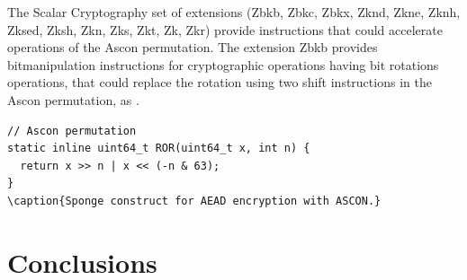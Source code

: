 \documentclass[11pt,twoside]{article}
\begin{document}
The Scalar Cryptography set of extensions (Zbkb, Zbkc, Zbkx, Zknd, Zkne, Zknh, Zksed, Zksh, Zkn, Zks, Zkt, Zk, Zkr) \cite{riscvCryptoVol1} provide instructions that could accelerate operations of the Ascon permutation.
The extension Zbkb provides bitmanipulation instructions for cryptographic operations having bit rotations operations, that could replace the rotation using two shift instructions in the Ascon permutation, as .

\begin{verbatim}
// Ascon permutation
static inline uint64_t ROR(uint64_t x, int n) {
  return x >> n | x << (-n & 63);
}
\caption{Sponge construct for AEAD encryption with ASCON.}
\end{verbatim}

\section{Conclusions}

\printbibliography
\end{document}
